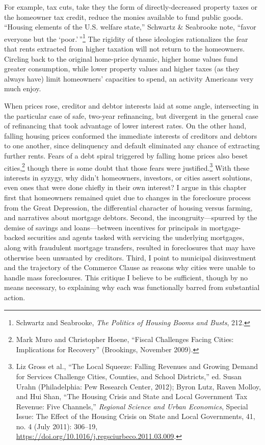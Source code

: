 \documentclass[12pt,oneside]{psthesis}
\begin{document}
For example, tax cuts, take they the form of directly-decreased property taxes or the homeowner tax credit, reduce the monies available to fund public goods.
``Housing elements of the U.S. welfare state,'' Schwartz \& Seabrooke note, ``favor everyone but the `poor.'\,''\footnote{Schwartz and Seabrooke, \emph{The Politics of Housing Booms and Busts}, 212.}
The rigidity of these ideologies rationalizes the fear that rents extracted from higher taxation will not return to the homeowners.
Circling back to the original home-price dynamic, higher home values fund greater consumption, while lower property values and higher taxes (as they always have) limit homeowners' capacities to spend, an activity Americans very much enjoy.

When prices rose, creditor and debtor interests laid at some angle, intersecting in the particular case of safe, two-year refinancing, but divergent in the general case of refinancing that took advantage of lower interest rates.
On the other hand, falling housing prices conformed the immediate interests of creditors and debtors to one another, since delinquency and default eliminated any chance of extracting further rents.
Fears of a debt spiral triggered by falling home prices also beset cities,\footnote{Mark Muro and Christopher Hoene, ``Fiscal Challenges Facing Cities: Implications for Recovery'' (Brookings, November 2009).} though there is some doubt that those fears were justified.\footnote{Liz Gross et al., ``The Local Squeeze: Falling Revenues and Growing Demand for Services Challenge Cities, Counties, and School Districts,'' ed. Susan Urahn (Philadelphia: Pew Research Center, 2012); Byron Lutz, Raven Molloy, and Hui Shan, ``The Housing Crisis and State and Local Government Tax Revenue: Five Channels,'' \emph{Regional Science and Urban Economics}, Special Issue: The Effect of the Housing Crisis on State and Local Governments, 41, no. 4 (July 2011): 306--19, \url{https://doi.org/10.1016/j.regsciurbeco.2011.03.009}.}
With these interests in syzygy, why didn't homeowners, investors, or cities assert solutions, even ones that were done chiefly in their own interest?
I argue in this chapter first that homeowners remained quiet due to changes in the foreclosure process from the Great Depression, the differential character of housing versus farming, and narratives about mortgage debtors.
Second, the incongruity---spurred by the demise of savings and loans---between incentives for principals in mortgage-backed securities and agents tasked with servicing the underlying mortgages, along with fraudulent mortgage transfers, resulted in foreclosures that may have otherwise been unwanted by creditors.
Third, I point to municipal disinvestment and the trajectory of the Commerce Clause as reasons why cities were unable to handle mass foreclosures.
This critique I believe to be sufficient, though by no means necessary, to explaining why each was functionally barred from substantial action.
\end{document}
